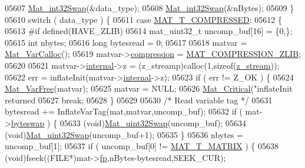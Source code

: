 \begin{DoxyCode}
{{{{{{{{{{{{{{{{{{{{{{{{{{{{{{{{{05607         \hyperlink{endian_8c_a2e0153996243f0a34df9a5286087cfa3}{Mat\_int32Swap}(&data\_type);
05608         \hyperlink{endian_8c_a2e0153996243f0a34df9a5286087cfa3}{Mat\_int32Swap}(&nBytes);
05609     \}
05610     \textcolor{keywordflow}{switch} ( data\_type ) \{
05611         \textcolor{keywordflow}{case} \hyperlink{group___m_a_t_ggacf7b3b879282b7ab3a51190e49bf3453a30437f2eb3becc2fa6e5d96599d7f724}{MAT\_T\_COMPRESSED}:
05612         \{
05613 \textcolor{preprocessor}{#if defined(HAVE\_ZLIB)}
05614             mat\_uint32\_t uncomp\_buf[16] = \{0,\};
05615             \textcolor{keywordtype}{int}      nbytes;
05616             \textcolor{keywordtype}{long}     bytesread = 0;
05617 
05618             matvar               = \hyperlink{group___m_a_t_gae7c9c3699f6e9c31a9c490300013098c}{Mat\_VarCalloc}();
05619             matvar->\hyperlink{group___m_a_t_aeef0466048621cb2c959ba7f6c774d06}{compression}  = \hyperlink{group___m_a_t_gga768c318af97bd2567758ecb001ceb7f4a5181d2f71eab0f12f05ba65d4f13fb53}{MAT\_COMPRESSION\_ZLIB};
05620 
05621             matvar->\hyperlink{group___m_a_t_a6e97e3ed9f40c49322c18561c2a94e92}{internal}->z = (z\_streamp)calloc(1,\textcolor{keyword}{sizeof}(\hyperlink{structz__stream__s}{z\_stream}));
05622             err = inflateInit(matvar->\hyperlink{group___m_a_t_a6e97e3ed9f40c49322c18561c2a94e92}{internal}->z);
05623             \textcolor{keywordflow}{if} ( err != Z\_OK ) \{
05624                 \hyperlink{group___m_a_t_ga1d14716f7450530fd1c9d02413787f0e}{Mat\_VarFree}(matvar);
05625                 matvar = NULL;
05626                 \hyperlink{group__mat__util_gaf51f2bfbb5580f575e4dd79757e2b80c}{Mat\_Critical}(\textcolor{stringliteral}{"inflateInit returned %
05627                 \textcolor{keywordflow}{break};
05628             \}
05629 
05630             \textcolor{comment}{/* Read variable tag */}
05631             bytesread += InflateVarTag(mat,matvar,uncomp\_buf);
05632             \textcolor{keywordflow}{if} ( mat->\hyperlink{struct__mat__t_a99d207977af5e04941ace56d71817a40}{byteswap} ) \{
05633                 (void)\hyperlink{endian_8c_a8cb0d0750e2eaf9840d95db531934f4f}{Mat\_uint32Swap}(uncomp\_buf);
05634                 (void)\hyperlink{endian_8c_a8cb0d0750e2eaf9840d95db531934f4f}{Mat\_uint32Swap}(uncomp\_buf+1);
05635             \}
05636             nbytes = uncomp\_buf[1];
05637             \textcolor{keywordflow}{if} ( uncomp\_buf[0] != \hyperlink{group___m_a_t_ggacf7b3b879282b7ab3a51190e49bf3453a32985fee89a4df8db4b3f5d3a48823d3}{MAT\_T\_MATRIX} ) \{
05638                 (void)fseek((FILE*)mat->\hyperlink{struct__mat__t_a85f562e407ca9ad4d2a6e14f839432b7}{fp},nBytes-bytesread,SEEK\_CUR);
}}}}}}}}}}}}}}}}}}}}}}}}}}}}}}}}}}
\end{DoxyCode}
